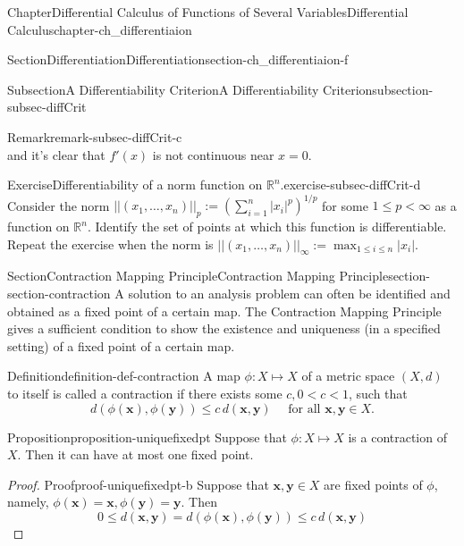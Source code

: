 \documentclass[oneside,10pt,]{book}
\numberwithin{equation}{section}
\newcommand{\bx}{\mathbf{x}}
\newcommand{\by}{\mathbf{y}}
\newcommand{\bbR}{\mathbb{R}}
\newcommand{\lt}{<}
\begin{document}
\begin{chapterptx}{Chapter}{Differential Calculus of Functions of Several Variables}{}{Differential Calculus}{}{}{chapter-ch_differentiaion}
\begin{sectionptx}{Section}{Differentiation}{}{Differentiation}{}{}{section-ch_differentiaion-f}
\begin{subsectionptx}{Subsection}{A Differentiability Criterion}{}{A Differentiability Criterion}{}{}{subsection-subsec-diffCrit}
\begin{remark}{Remark}{}{remark-subsec-diffCrit-c}
\begin{equation*}
\end{equation*}
and it's clear that \(f'(x)\) is not continuous near \(x=0\).\end{remark}
\begin{inlineexercise}{Exercise}{Differentiability of a norm function on \(\bbR^{n}\).}{exercise-subsec-diffCrit-d}%
Consider the norm \(||(x_{1}, \ldots, x_{n})||_{p}:= \left( \sum_{i=1}^{n}|x_{i}|^{p}\right)^{1/p}\) for some \(1 \le p \lt 
\infty\) as a function on \(\bbR^{n}\). Identify the set of points at which this function is differentiable. Repeat the exercise when the norm is \(||(x_{1}, \ldots, x_{n})||_{\infty}:=\max_{1\le i \le n} |x_{i}|\).\end{inlineexercise}%
\end{subsectionptx}
\end{sectionptx}
%
%
\typeout{************************************************}
\typeout{************************************************}
%
\begin{sectionptx}{Section}{Contraction Mapping Principle}{}{Contraction Mapping Principle}{}{}{section-section-contraction}
 A solution to an analysis problem can often be identified and obtained as a fixed point of a certain map. The Contraction Mapping Principle gives a sufficient condition to show the existence and uniqueness (in a specified setting) of a fixed point of a certain map. \begin{definition}{Definition}{}{definition-def-contraction}%
%
A map \(\phi:X\mapsto X\) of a metric space \((X, d)\) to itself is called a contraction if there exists some \(c, 0\lt c \lt 1\), such that%
\begin{equation*}
d(\phi(\bx), \phi(\by)) \le c\, d(\bx, \by) \quad \text{ for all $\bx, \by \in X$.}
\end{equation*}
\end{definition}
\begin{proposition}{Proposition}{}{}{proposition-uniquefixedpt}%
Suppose that \(\phi:X\mapsto X\) is a contraction of \(X\). Then it can have at most one fixed point.\end{proposition}
\begin{proof}{Proof}{}{proof-uniquefixedpt-b}
Suppose that \(\bx, \by\in X\) are fixed points of \(\phi\), namely, \(\phi(\bx)=\bx, \phi(\by)=\by\). Then%
\begin{equation*}
0\le d(\bx, \by)=d(\phi(\bx), \phi(\by)) \le c\, d(\bx, \by)
\end{equation*}

\end{proof}
\end{sectionptx}
\end{chapterptx}
\end{document}
